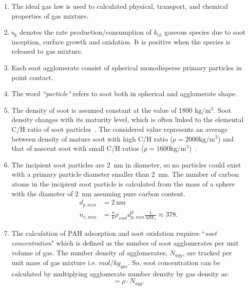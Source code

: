 \begin{enumerate}
\item The ideal gas law is used to calculated physical, transport, and chemical properties of gas mixture.
	
\item $\mathrm{\dot{s}_k}$ denotes the rate production/consumption of $k_{th}$ gaseous species due to soot inception, surface growth and oxidation. It is positive when the species is released to gas mixture.

\item Each soot agglomerate consist of spherical monodisperse primary particles in point contact.

\item The word \textit{``particle"} refers to soot both in spherical and agglomerate shape. 

\item The density of soot is assumed constant at the value of 1800 $\mathrm{kg/m^3}$. Soot density changes with its maturity level, which is often linked to the elemental C/H ratio of soot particles~\citep{michelsen2021effects}. The considered value represents an average between density of mature soot with high C/H ratio ($\mathrm{\rho=2000 kg/m^3}$) and that of nascent soot with small C/H ratios ($\mathrm{\rho=1600 kg/m^3}$)~\citep{jensen2007measurement, michelsen2021effects}.

\item The incipient soot particles are 2~nm in diameter, so no particles could exist with a primary particle diameter smaller than 2~nm. The number of carbon atoms in the incipient soot particle is calculated from the mass of a sphere with the diameter of 2~nm assuming pure carbon content.
\begin{equation}
	\begin{split}
	d_{p,min}&=2~\mathrm{nm} \\
	n_{c,min}& =\frac{\pi}{6}\rho_{soot}d^3_{p,min}\frac{1}{MW_c}\approx378
	\label{eqn:dp_min}.
	\end{split}
\end{equation}
\item The calculation of PAH adsorption and soot oxidation requires ``\textit{soot concentration}" which is defined as the number of soot agglomerates per unit volume of gas. The number density of agglomerates,  ${N_{agg}}$, are tracked per unit mass of gas mixture i.e. ${mol/kg_{gas}}$. So, soot concentration can be calculated by multiplying agglomerate number density by gas density as:
\begin{equation}
	[\mathrm{soot}] = \rho\cdot {N_{agg}}
	\label{eqn:sootconcen}.
\end{equation}


\end{enumerate}
